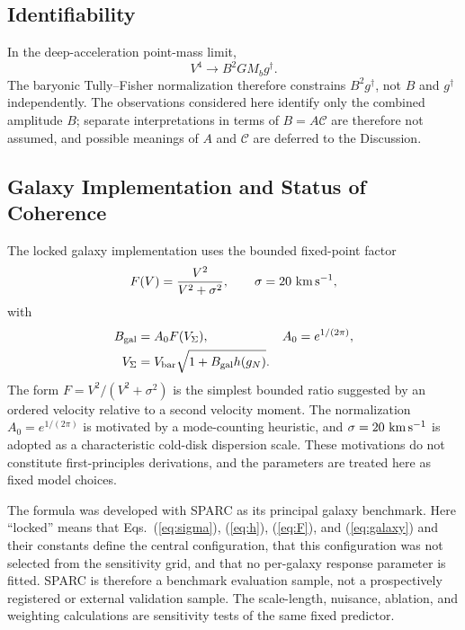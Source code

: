 \documentclass[aps,prd,reprint,superscriptaddress,showpacs,floatfix,longbibliography]{revtex4-2}
\begin{document}
\subsection{Identifiability}

In the deep-acceleration point-mass limit,
\begin{equation}
V^4\rightarrow B^2GM_b g^\dagger .
\label{eq:btfr}
\end{equation}
The baryonic Tully--Fisher normalization therefore constrains $B^2g^\dagger$, not $B$ and $g^\dagger$ independently. The observations considered here identify only the combined amplitude $B$; separate interpretations in terms of $B=A\mathcal C$ are therefore not assumed, and possible meanings of $A$ and $\mathcal C$ are deferred to the Discussion.

\subsection{Galaxy Implementation and Status of Coherence}

The locked galaxy implementation uses the bounded fixed-point factor
\begin{equation}
F(V)=\frac{V^2}{V^2+\sigma^2},
\qquad \sigma=20\ {\rm km\,s^{-1}},
\label{eq:F}
\end{equation}
with
\begin{equation}
\begin{aligned}
B_{\rm gal}&=A_0F(V_\Sigma),&
A_0&=e^{1/(2\pi)},\\
V_\Sigma&=V_{\rm bar}\sqrt{1+B_{\rm gal}h(g_N)}.&&
\end{aligned}
\label{eq:galaxy}
\end{equation}
The form $F=V^2/(V^2+\sigma^2)$ is the simplest bounded ratio suggested by an ordered velocity relative to a second velocity moment. The normalization $A_0=e^{1/(2\pi)}$ is motivated by a mode-counting heuristic, and $\sigma=20\ {\rm km\,s^{-1}}$ is adopted as a characteristic cold-disk dispersion scale. These motivations do not constitute first-principles derivations, and the parameters are treated here as fixed model choices.

The formula was developed with SPARC as its principal galaxy benchmark. Here ``locked'' means that Eqs.~(\ref{eq:sigma}), (\ref{eq:h}), (\ref{eq:F}), and (\ref{eq:galaxy}) and their constants define the central configuration, that this configuration was not selected from the sensitivity grid, and that no per-galaxy response parameter is fitted. SPARC is therefore a benchmark evaluation sample, not a prospectively registered or external validation sample. The scale-length, nuisance, ablation, and weighting calculations are sensitivity tests of the same fixed predictor.
\end{document}

